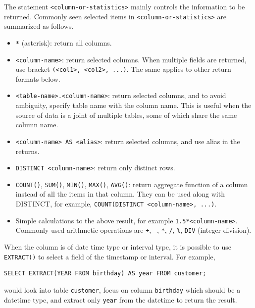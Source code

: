 The statement \verb|<column-or-statistics>| mainly controls the information to be returned. Commonly seen selected items in \verb|<column-or-statistics>| are summarized as follows.
\begin{itemize}
  \item \verb|*| (asterisk): return all columns.
  \item \verb|<column-name>|: return selected columns.  When multiple fields are returned, use bracket \verb|(<col1>, <col2>, ...)|. The same applies to other return formats below.
  \item \verb|<table-name>.<column-name>|: return selected columns, and to avoid ambiguity, specify table name with the column name. This is useful when the source of data is a joint of multiple tables, some of which share the same column name.
  \item \verb|<column-name> AS <alias>|: return selected columns, and use alias in the returns.
  \item \verb|DISTINCT <column-name>|: return only distinct rows.
  \item \verb|COUNT()|, \verb|SUM()|, \verb|MIN()|, \verb|MAX()|, \verb|AVG()|: return aggregate function of a column instead of all the items in that column. They can be used along with DISTINCT, for example, \verb|COUNT(DISTINCT <column-name>, ...)|.
  \item Simple calculations to the above result, for example \verb|1.5*<column-name>|. Commonly used arithmetic operations are \verb|+|, \verb|-|, \verb|*|, \verb|/|, \verb|%|, \verb|DIV| (integer division).
\end{itemize}
When the column is of date time type or interval type, it is possible to use \verb|EXTRACT()| to select a field of the timestamp or interval. For example,
\begin{lstlisting}
SELECT EXTRACT(YEAR FROM birthday) AS year FROM customer;
\end{lstlisting}
would look into table \verb|customer|, focus on column \verb|birthday| which should be a datetime type, and extract only \verb|year| from the datetime to return the result.


